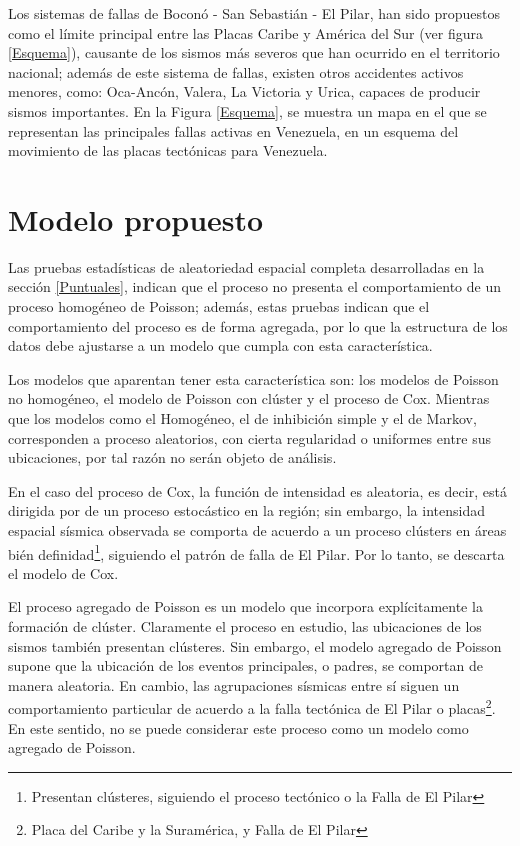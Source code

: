 \documentclass[12pt]{report}
\begin{document}
{{{{{{{{{{{{{{{Los sistemas de fallas de Boconó - San Sebastián - El Pilar, han sido propuestos como el límite principal entre las Placas Caribe y América del Sur (ver figura \ref{Esquema}), causante de los sismos más severos que han ocurrido en el territorio nacional; además de este sistema de fallas, existen otros accidentes activos menores, como: Oca-Ancón, Valera, La Victoria y Urica, capaces de producir sismos importantes. En la Figura   \ref{Esquema}, se muestra un mapa en el que se representan las principales fallas activas en Venezuela, en un esquema  del movimiento de las placas tectónicas para Venezuela.

		
		
		
			\section{Modelo propuesto}
		
  Las pruebas estadísticas de aleatoriedad espacial completa desarrolladas en la sección \ref{Puntuales},   indican que el proceso no presenta el comportamiento de un  proceso  homogéneo de Poisson;  además,  estas pruebas indican que el comportamiento del proceso es de forma agregada, por lo que la estructura de los datos debe ajustarse a un modelo que cumpla con esta característica.  
  
  Los modelos que  aparentan tener esta característica son:  los modelos de  Poisson no homogéneo,  el modelo de Poisson con clúster y el proceso de Cox.  Mientras que los modelos como el Homogéneo, el de inhibición simple y el de  Markov, corresponden a proceso aleatorios, con cierta regularidad o uniformes entre sus ubicaciones, por tal razón no serán objeto de análisis. 

  En el caso del proceso de Cox, la función de intensidad es aleatoria, es decir,  está dirigida por de un proceso estocástico en la región; sin embargo,  la intensidad espacial sísmica observada se comporta de acuerdo a un proceso clústers en áreas bién definidad{\footnote{Presentan clústeres, siguiendo el proceso tectónico o la Falla de El Pilar}}, siguiendo el patrón de falla de El Pilar.  Por lo tanto, se descarta el modelo de Cox.  

  El proceso agregado de Poisson es un modelo que incorpora explícitamente la formación de clúster. Claramente el proceso en estudio,  las ubicaciones de los sismos  también presentan clústeres. Sin embargo, el modelo agregado de Poisson supone que la ubicación de los eventos principales, o padres, se comportan de manera aleatoria. En cambio, las agrupaciones sísmicas entre sí siguen un comportamiento particular de acuerdo a la falla tectónica de El Pilar o placas{\footnote{Placa del Caribe y la Suramérica, y Falla de El Pilar }}. En este sentido, no se puede  considerar este proceso como un  modelo como agregado de Poisson.


}}}}}}}}}}}}}}}
\end{document}
